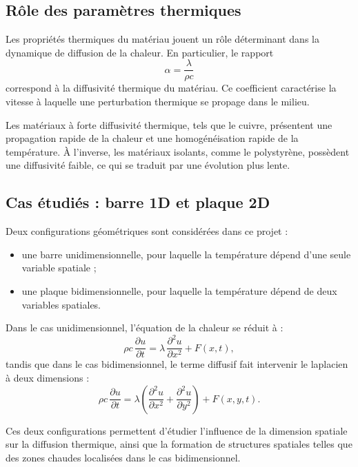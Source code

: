 \documentclass[a4paper,12pt]{article}
\begin{document}
\subsection{Rôle des paramètres thermiques}

Les propriétés thermiques du matériau jouent un rôle déterminant dans la dynamique de diffusion de la chaleur. En particulier, le rapport
\begin{equation}
\alpha = \frac{\lambda}{\rho c}
\end{equation}
correspond à la diffusivité thermique du matériau. Ce coefficient caractérise la vitesse à laquelle une perturbation thermique se propage dans le milieu.

Les matériaux à forte diffusivité thermique, tels que le cuivre, présentent une propagation rapide de la chaleur et une homogénéisation rapide de la température. À l’inverse, les matériaux isolants, comme le polystyrène, possèdent une diffusivité faible, ce qui se traduit par une évolution plus lente.

\subsection{Cas étudiés : barre 1D et plaque 2D}

Deux configurations géométriques sont considérées dans ce projet :
\begin{itemize}
    \item une barre unidimensionnelle, pour laquelle la température dépend d’une seule variable spatiale ;
    \item une plaque bidimensionnelle, pour laquelle la température dépend de deux variables spatiales.
\end{itemize}

Dans le cas unidimensionnel, l’équation de la chaleur se réduit à :
\begin{equation}
\rho c \, \frac{\partial u}{\partial t}
= \lambda \, \frac{\partial^2 u}{\partial x^2} + F(x,t),
\end{equation}
tandis que dans le cas bidimensionnel, le terme diffusif fait intervenir le laplacien à deux dimensions :
\begin{equation}
\rho c \, \frac{\partial u}{\partial t}
= \lambda \left(
\frac{\partial^2 u}{\partial x^2}
+
\frac{\partial^2 u}{\partial y^2}
\right) + F(x,y,t).
\end{equation}

Ces deux configurations permettent d’étudier l’influence de la dimension spatiale sur la diffusion thermique, ainsi que la formation de structures spatiales telles que des zones chaudes localisées dans le cas bidimensionnel.
\end{document}
